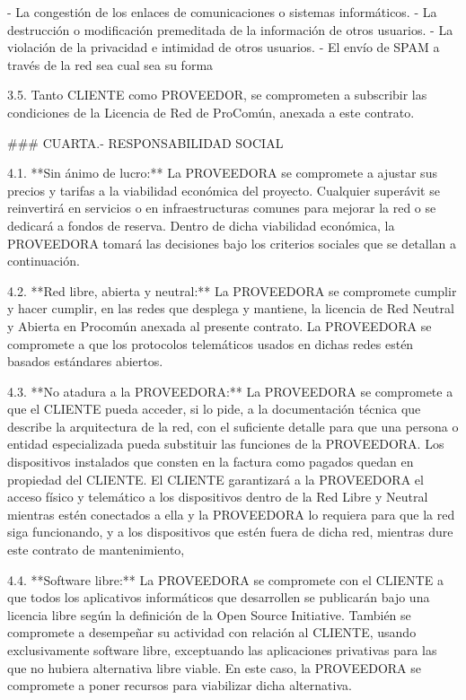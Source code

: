 - La congestión de los enlaces de comunicaciones o sistemas informáticos.
- La destrucción o modificación premeditada de la información de otros usuarios.
- La violación de la privacidad e intimidad de otros usuarios.
- El envío de SPAM a través de la red sea cual sea su forma


3.5.
	Tanto CLIENTE como PROVEEDOR, se comprometen a subscribir las condiciones de
	la Licencia de Red de ProComún, anexada a este contrato.



### CUARTA.- RESPONSABILIDAD SOCIAL

4.1. **Sin ánimo de lucro:**
	La PROVEEDORA se compromete a ajustar sus precios y tarifas a la viabilidad económica del proyecto.
	Cualquier superávit se reinvertirá en servicios o en infraestructuras comunes para mejorar la red o
	se dedicará a fondos de reserva.
	Dentro de dicha viabilidad económica, la PROVEEDORA tomará las decisiones
	bajo los criterios sociales que se detallan a continuación.

4.2. **Red libre, abierta y neutral:**
	La PROVEEDORA se compromete cumplir y hacer cumplir,
	en las redes que desplega y mantiene,
	la licencia de Red Neutral y Abierta en Procomún
	anexada al presente contrato.
	La PROVEEDORA se compromete a que los protocolos telemáticos
	usados en dichas redes estén basados estándares abiertos.

4.3. **No atadura a la PROVEEDORA:**
	La PROVEEDORA se compromete a que el CLIENTE pueda acceder, si lo pide,
	a la documentación técnica que describe la arquitectura de la red,
	con el suficiente detalle para que una persona o entidad especializada
	pueda substituir las funciones de la PROVEEDORA.
	Los dispositivos instalados que consten en la factura como pagados quedan en propiedad del CLIENTE.
	El CLIENTE garantizará a la PROVEEDORA el acceso físico y telemático
	a los dispositivos dentro de la Red Libre y Neutral mientras estén conectados a ella
	y la PROVEEDORA lo requiera para que la red siga funcionando,
	y a los dispositivos que estén fuera de dicha red, mientras dure este contrato de mantenimiento,

4.4. **Software libre:**
	La PROVEEDORA se compromete con el CLIENTE a que todos los aplicativos informáticos que desarrollen
	se  publicarán bajo una licencia libre según la definición de la Open Source Initiative.
	También se compromete a desempeñar su actividad con relación al CLIENTE,
	usando exclusivamente software libre, 
	exceptuando las aplicaciones privativas para las que no hubiera alternativa libre viable.
	En este caso, la PROVEEDORA se compromete a poner recursos para viabilizar dicha alternativa.

